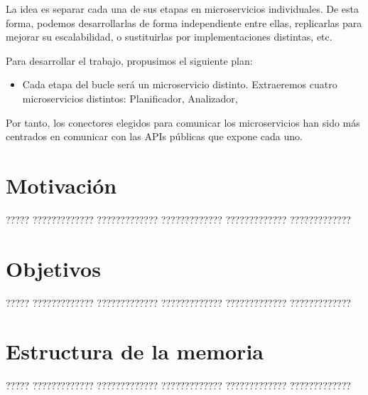 La idea es separar cada una de sus etapas en microservicios individuales. De esta forma, podemos desarrollarlas de forma independiente entre ellas, replicarlas para mejorar su escalabilidad, o sustituirlas por implementaciones distintas, etc.

Para desarrollar el trabajo, propusimos el siguiente plan:
\begin{itemize}
  \item Cada etapa del bucle será un microservicio distinto. Extraeremos cuatro microservicios distintos: Planificador, Analizador,
\end{itemize}

Por tanto, los conectores elegidos para comunicar los microservicios han sido más centrados en comunicar con las APIs públicas que expone cada uno.

\section{Motivación}

????? ????????????? ????????????? ????????????? ????????????? ?????????????

\section{Objetivos}

????? ????????????? ????????????? ????????????? ????????????? ?????????????

\section{Estructura de la memoria}

????? ????????????? ????????????? ????????????? ????????????? ?????????????


